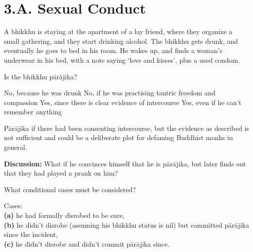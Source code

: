 \chapter{3.A. Sexual Conduct}
\renewcommand*{\theChapterTitle}{3.A. Sexual Conduct}

\begin{exam}{\autoExamName}

\begin{problem}

  A bhikkhu is staying at the apartment of a lay friend, where they organize a small
  gathering, and they start drinking alcohol. The bhikkhu gets drunk, and
  eventually he goes to bed in his room. He wakes up, and finds a woman's
  underwear in his bed, with a note saying `love and kisses', plus a used
  condom.

  Is the bhikkhu pārājika? 

  \bigskip
 
  \begin{answers}{1}
    \bChoices
     No, because he was drunk\eAns
     No, if he was practising tantric freedom and compassion\eAns
     Yes, since there is clear evidence of intercourse\eAns
     Yes, even if he can't remember anything\eAns
    \eChoices
  \end{answers}

  \bigskip

  \begin{solution}
    Pārājika if there had been consenting intercourse,
    but the evidence as described is not sufficient
    and could be a deliberate plot for defaming Buddhist monks in general.
  \end{solution}

  \textbf{Discussion:} What if he convinces himself that he is pārājika,
  but later finds out that they had played a prank on him?

  What conditional cases must be considered?

  \begin{solution}
    Cases:\\
    \textbf{(a)} he had formally disrobed to be sure,\\
    \textbf{(b)} he didn't disrobe (assuming his bhikkhu status is nil) but committed pārājika since the incident,\\
    \textbf{(c)} he didn't disrobe and didn't commit pārājika since.
  \end{solution}
  
\end{problem}


\end{exam}
